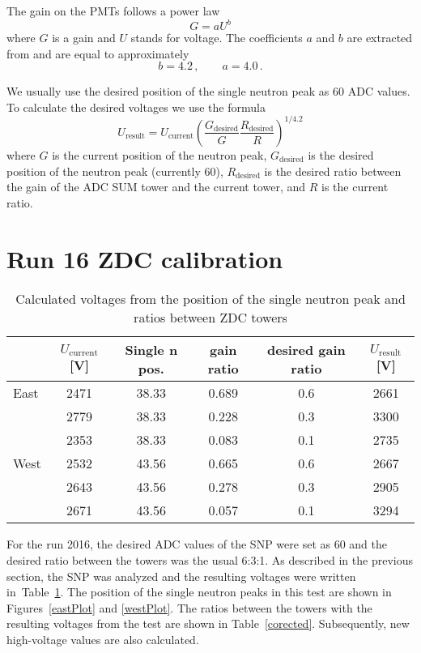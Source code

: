 The gain on the PMTs follows a power law
\begin{equation}
G = aU^b
\end{equation}
where $G$ is a gain and $U$ stands for voltage. The coefficients $a$ and $b$ are 
extracted from \cite{ZDCvoltsDependence}
and are equal to approximately
\begin{equation}
b=4.2\,, \qquad a=4.0\,.
\end{equation}

We usually use the desired position of the single neutron peak as 60 ADC values. To calculate
the desired voltages we use the formula
\begin{equation}
U_{\text{result}} = U_\text{current}\left(\frac{G_\text{desired}}{G} 
\frac{R_\text{desired}}{R}\right)^{1/4.2}
\end{equation}
where $G$ is the current position of the neutron peak, $G_\text{desired}$ is the desired position
of the neutron peak (currently 60), $R_\text{desired}$ is the desired ratio between the gain of the ADC SUM
tower and the current tower, and $R$ is the current ratio.

\section{Run 16 ZDC calibration}

\begin{table}[t] 
\caption{Calculated voltages from the position of the single neutron peak and ratios 
between ZDC towers}
\label{uncorected}
\begin{center}
\begin{tabular}{lccccc}
 \toprule
 &$U_\text{current}$[V]&Single n pos.&gain ratio&desired gain ratio&$U_\text{result}$[V]\\
\midrule
 East&2471&38.33&0.689&0.6&2661\\
     &2779&38.33&0.228&0.3&3300\\
     &2353&38.33&0.083&0.1&2735\\
 \midrule
West&2532&43.56&0.665&0.6&2667\\
    &2643&43.56&0.278&0.3&2905\\
    &2671&43.56&0.057&0.1&3294\\
 \bottomrule
\end{tabular}
\end{center}
\end{table}

For the run 2016, the desired ADC values of the SNP were set as 60 and the desired ratio between the
towers was the usual 6:3:1. As described in the previous section, the SNP was analyzed
and the resulting voltages were written in~Table~\ref{uncorected}. The position of the single
neutron peaks in this test
are shown in Figures~\ref{eastPlot} and \ref{westPlot}.
The ratios between the towers with the resulting voltages from the test
are shown in Table~\ref{corected}.
Subsequently, new high-voltage values are also calculated.


